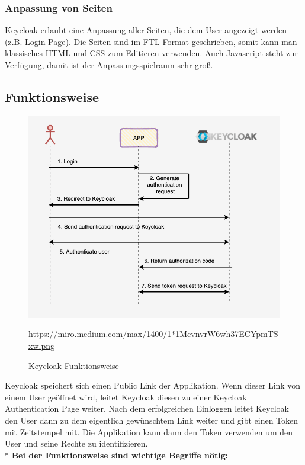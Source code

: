 \subsubsection{Anpassung von Seiten}
Keycloak erlaubt eine Anpassung aller Seiten, die dem User angezeigt werden (z.B. Login-Page). Die Seiten sind im FTL Format geschrieben, somit kann man klassisches HTML und CSS zum Editieren verwenden.
Auch Javascript steht zur Verfügung, damit ist der Anpassungsspielraum sehr groß. \cite{KeyCloakDZone}
\pagebreak

\subsection{Funktionsweise}
\begin{figure}[htp]
    \centering
    \includegraphics[scale=0.55]{pics/Keycloak-Funktionsweise2.png}
    \caption{Keycloak Funktionsweise}
    \small \url{https://miro.medium.com/max/1400/1*1McvnvrW6wh37ECYpmTSxw.png}
    \label{fig:impl:KeycloakFunc}
\end{figure}

Keycloak speichert sich einen Public Link der Applikation. Wenn dieser Link von einem User geöffnet wird, leitet Keycloak diesen zu einer Keycloak Authentication Page weiter.
Nach dem erfolgreichen Einloggen leitet Keycloak den User dann zu dem eigentlich gewünschtem Link weiter und gibt einen Token mit Zeitstempel mit.
Die Applikation kann dann den Token verwenden um den User und seine Rechte zu identifizieren. \cite{KeycloakMakeIT} \\*
\textbf{Bei der Funktionsweise sind wichtige Begriffe nötig:}

